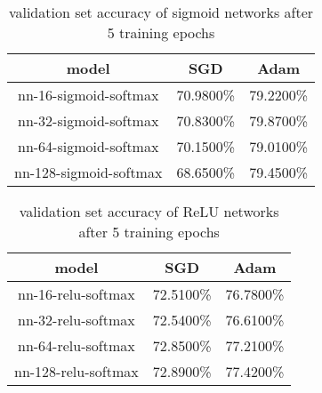 \begin{table}[H]
    \centering
    \begin{tabular}{ | c | c | c | }
         \hline
         \textbf{model} & \textbf{SGD} & \textbf{Adam} \\
         \hline
         nn-16-sigmoid-softmax & 70.9800\% & 79.2200\% \\
         \hline
         nn-32-sigmoid-softmax & 70.8300\% & 79.8700\% \\
         \hline
         nn-64-sigmoid-softmax & 70.1500\% & 79.0100\% \\
         \hline
         nn-128-sigmoid-softmax & 68.6500\% & 79.4500\% \\
         \hline
    \end{tabular}

    \caption{validation set accuracy of sigmoid networks after 5 training epochs}
    \label{table:experiments:classification:optimizers-sigmoid}
\end{table}
\begin{table}[H]
    \centering
    \begin{tabular}{ | c | c | c | }
         \hline
         \textbf{model} & \textbf{SGD} & \textbf{Adam} \\
         \hline
         nn-16-relu-softmax & 72.5100\% & 76.7800\% \\
         \hline
         nn-32-relu-softmax & 72.5400\% & 76.6100\% \\
         \hline
         nn-64-relu-softmax & 72.8500\% & 77.2100\% \\
         \hline
         nn-128-relu-softmax & 72.8900\% & 77.4200\% \\
         \hline
    \end{tabular}

    \caption{validation set accuracy of ReLU networks after 5 training epochs}
    \label{table:experiments:classification:optimizers-relu}
\end{table}